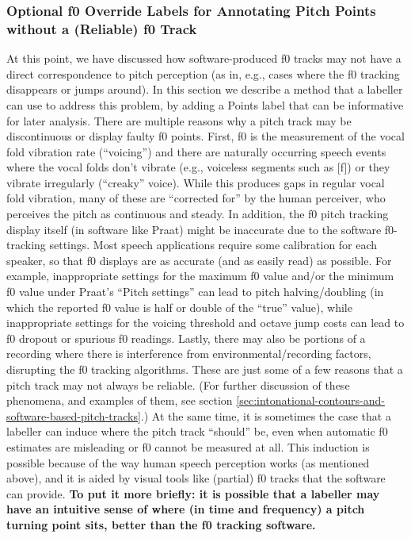 \documentclass[11pt, twoside]{memoir}
\begin{document}
{{\subsubsection{Optional f0 Override Labels for Annotating Pitch Points without a (Reliable) f0 Track}\label{sec:optional-f0-override-labels-for-annotating-pitch-points-without-a-reliable-f0-track}
At this point, we have discussed how software-produced f0 tracks may not have a direct correspondence to pitch perception (as in, e.g., cases where the f0 tracking disappears or jumps around). In this section we describe a method that a labeller can use to address this problem, by adding a Points label that can be informative for later analysis.
There are multiple reasons why a pitch track may be discontinuous or display faulty f0 points. First, f0 is the measurement of the vocal fold vibration rate (“voicing”) and there are naturally occurring speech events where the vocal folds don’t vibrate (e.g., voiceless segments such as [f]) or they vibrate irregularly (“creaky” voice). While this produces gaps in regular vocal fold vibration, many of these are “corrected for” by the human perceiver, who perceives the pitch as continuous and steady.
In addition, the f0 pitch tracking display itself (in software like Praat) might be inaccurate due to the software f0-tracking settings. Most speech applications require some calibration for each speaker, so that f0 displays are as accurate (and as easily read) as possible. For example, inappropriate settings for the maximum f0 value and/or the minimum f0 value under Praat’s “Pitch settings” can lead to pitch halving\slash doubling (in which the reported f0 value is half or double of the “true” value), while inappropriate settings for the voicing threshold and octave jump costs can lead to f0 dropout or spurious f0 readings.
Lastly, there may also be portions of a recording where there is interference from environmental\slash recording factors, disrupting the f0 tracking algorithms.
These are just some of a few reasons that a pitch track may not always be reliable. (For further discussion of these phenomena, and examples of them, see section \ref{sec:intonational-contours-and-software-based-pitch-tracks}.) At the same time, it is sometimes the case that a labeller can induce where the pitch track “should” be, even when automatic f0 estimates are misleading or f0 cannot be measured at all. This induction is possible because of the way human speech perception works (as mentioned above), and it is aided by visual tools like (partial) f0 tracks that the software can provide. \textbf{To put it more briefly: it is possible that a labeller may have an intuitive sense of where (in time and frequency) a pitch turning point sits, better than the f0 tracking software.}
}}
\end{document}
